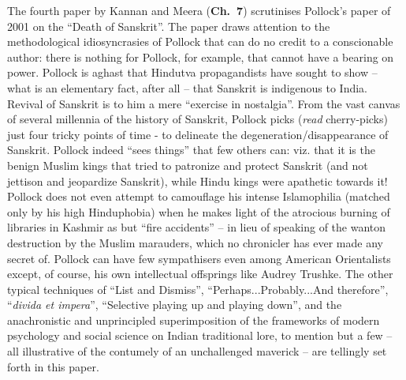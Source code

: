 The fourth paper by Kannan and Meera ({\bf Ch.~7}) scrutinises Pollock’s paper of 2001 on the “Death of Sanskrit”. The paper draws attention to the methodological idiosyncrasies of Pollock that can do no credit to a conscionable author: there is nothing for Pollock, for example, that cannot have a bearing on power. Pollock is aghast that Hindutva propagandists have sought to show – what is an elementary fact, after all – that Sanskrit is indigenous to India.  Revival of Sanskrit is to him a mere “exercise in nostalgia”. From the vast canvas of several millennia of the history of Sanskrit, Pollock picks ({\sl read} cherry-picks) just four tricky points of time - to delineate the degeneration/disappearance of Sanskrit. Pollock indeed “sees things” that few others can: viz. that it is the benign Muslim kings that tried to patronize and protect Sanskrit (and not jettison and jeopardize Sanskrit), while Hindu kings were apathetic towards it! Pollock does not even attempt to camouflage his intense Islamophilia (matched only by his high Hinduphobia) when he makes light of the atrocious burning of libraries in Kashmir as but “fire accidents” – in lieu of speaking of the wanton destruction by the Muslim marauders, which no chronicler has ever made any secret of. Pollock can have few sympathisers even among American Orientalists except, of course, his own intellectual offsprings like Audrey Trushke. The other typical techniques of “List and Dismiss”, “Perhaps...Probably...And therefore”, “{\sl divida et impera}”, “Selective playing up and playing down”, and the anachronistic and unprincipled superimposition of the frameworks of modern psychology and social science on Indian traditional lore, to mention but a few – all illustrative of the contumely of an unchallenged maverick – are tellingly set forth in this paper.

